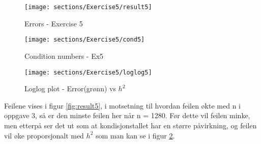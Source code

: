 \vspace{3mm}

\begin{figure}[h]
\centering
\begin{minipage}{.5\textwidth}
  \centering
  \texttt{[image: sections/Exercise5/result5]}
    \caption{Errors - Exercise 5}
    \label{fig:result5}
\end{minipage}%
\begin{minipage}{.5\textwidth}
  \centering
  \texttt{[image: sections/Exercise5/cond5]}
    \caption{Condition numbers - Ex5}
    \label{fig:cond5}
\end{minipage}
\end{figure}

\begin{figure}[h!]
    \centering
    \texttt{[image: sections/Exercise5/loglog5]}
    \caption{Loglog plot - Error(grønn) vs $h^2$}
    \label{fig:loglog5}
\end{figure}


Feilene vises i figur \ref{fig:result5}, i motsetning til hvordan feilen økte med n i oppgave 3, så er den minste feilen her når n = 1280. Før dette vil feilen minke, men etterpå ser det ut som at kondisjonstallet har en større påvirkning, og feilen vil øke proporsjonalt med $h^2$ som man kan se i figur \ref{fig:loglog5}.


% 